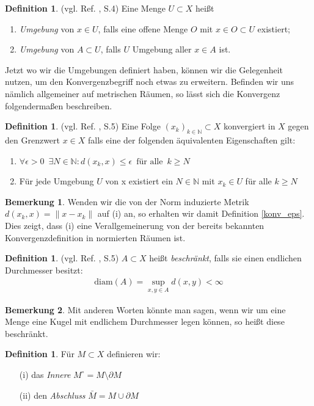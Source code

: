 \documentclass[10pt,a4paper]{article}
\theoremstyle{plain}
\theoremstyle{definition}
\newtheorem{definition}[satz]{Definition}
\newenvironment{dfi}{\begin{shaded}\begin{definition}}{\end{definition}\end{shaded}}
\theoremstyle{nonumberplain}
\newtheorem{bemerkung}{Bemerkung}
\newenvironment{bem}{\begin{bemerkung}}{\end{bemerkung}}
\newcommand{\N}{\mathbb{N}}
\begin{document}
\newpage
\begin{dfi}
\label{Umgebung}
(vgl. Ref. \cite{Clason}, S.4)  Eine Menge $U \subset X$ heißt
\begin{enumerate}[label=(\roman*)]
\item \textit{Umgebung} von $x \in U$, falls eine offene Menge $O$ mit $x \in O \subset U$ existiert;
\item \textit{Umgebung} von $A \subset U$, falls $U$ Umgebung aller $x \in A$ ist.
\end{enumerate}
\end{dfi}
\noindent Jetzt wo wir die Umgebungen definiert haben, können wir die Gelegenheit nutzen, um den Konvergenzbegriff noch etwas zu erweitern. Befinden wir uns nämlich allgemeiner auf metrischen Räumen, so lässt sich die Konvergenz folgendermaßen beschreiben.
\begin{dfi}
\label{konv_metrik}
(vgl. Ref. \cite{Clason}, S.5) Eine Folge ${(x_k)}_{k \in \N} \subset X$ konvergiert in $X$ gegen den Grenzwert $x \in X$ falls eine der folgenden äquivalenten Eigenschaften gilt:
\begin{enumerate}[label=(\roman*)]
\item $\forall \epsilon > 0 \enspace \exists N \in \N : d(x_k,x) \leq \epsilon \enspace \text{für alle} \enspace k \geq N$
\item Für jede Umgebung $U$ von x existiert ein $N \in \N$ mit $x_k \in U$ für alle $k \geq N$
\end{enumerate}
\end{dfi}
\begin{bem}
Wenden wir die von der Norm induzierte Metrik $d(x_k, x) = \|x - x_k\|$ auf (i) an, so erhalten wir damit Definition \hyperref[konv_eps]{\ref*{konv_eps}}. Dies zeigt, dass (i) eine Verallgemeinerung von der bereits bekannten Konvergenzdefinition in normierten Räumen ist.
\end{bem}
\begin{dfi}
(vgl. Ref. \cite{Clason}, S.5) $A \subset X$ heißt \textit{beschränkt}, falls sie einen endlichen Durchmesser besitzt:
\begin{align*}
\text{diam}(A) = \sup_{x,y \in A}{d(x,y)} < \infty
\end{align*}
\end{dfi}
\begin{bem}
Mit anderen Worten könnte man sagen, wenn wir um eine Menge eine Kugel mit endlichem Durchmesser legen können, so heißt diese beschränkt.
\end{bem}
\begin{dfi}
Für $M \subset X$ definieren wir:
\begin{itemize}
\item[(i)] das \textit{Innere} $M^\circ = M \setminus \partial M$
\item[(ii)] den \textit{Abschluss} $\bar{M} = M \cup \partial M$
\end{itemize}
\end{dfi}
\end{document}
